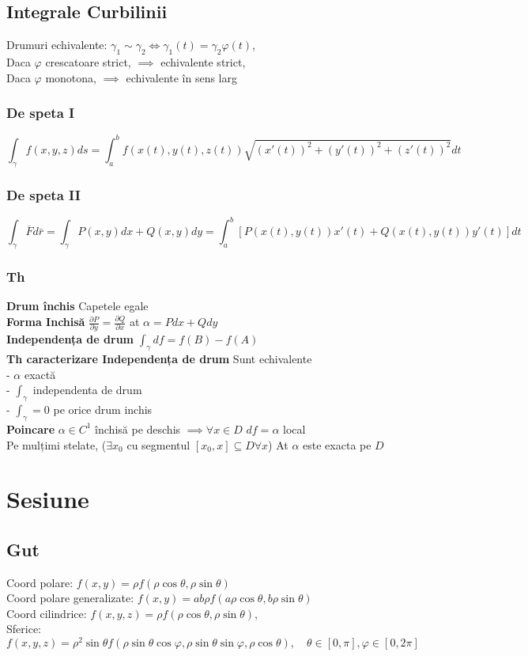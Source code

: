 \documentclass{article}
\newcommand{\parti}[2]{\frac{\partial #1}{ \partial #2}}
\renewcommand*{\phi}{\varphi}
\begin{document}
\subsection*{Integrale Curbilinii}
Drumuri echivalente: $\gamma_1 \sim \gamma_2 \iff \gamma_1(t) = \gamma_2{\phi(t)}$, \\
Daca $\phi$ crescatoare strict, $\implies$ echivalente strict,\\
Daca $\phi$ monotona, $\implies$ echivalente în sens larg
\subsubsection*{De speta I}
\[ \int_{\gamma} f(x, y, z)ds = \int_a^bf(x(t), y(t), z(t)) \sqrt{(x'(t))^2+(y'(t))^2+(z'(t))^2} dt \]

\subsubsection*{De speta II}
\[ \int_{\gamma}\overline{F}d\bar{r} = \int_{\gamma} P(x,y) dx+ Q(x,y)dy = \int_a^b \left[P(x(t), y(t))x'(t) + Q(x(t), y(t)) y'(t) \right]dt \]
\subsubsection*{Th}
\textbf{Drum închis} Capetele egale\\
\textbf{Forma Inchisă} $\parti{P}{y} = \parti{Q}{x}$ at $\alpha = Pdx+Qdy$\\
\textbf{Independența de drum} $\int_\gamma df = f(B) - f(A)$\\
\textbf{Th caracterizare Independența de drum} Sunt echivalente\\
\quad - $\alpha$ exactă\\
\quad - $\int_\gamma$ independenta de drum\\
\quad - $\int_\gamma = 0$ pe orice drum inchis \\
\textbf{Poincare} $\alpha \in C^1$ închisă pe deschis $\implies \forall x\in D$
$df = \alpha$ local
\\
Pe mulțimi stelate, ($\exists x_0$ cu segmentul $[x_0, x] \subseteq D \forall x$)
At $\alpha$ este exacta pe $D$



\newpage

\section{Sesiune}
\subsection*{Gut}
Coord polare: $f(x,y) = \rho f(\rho \cos \theta, \rho \sin\theta)$ \\
Coord polare generalizate: $f(x,y) = ab\rho f(a\rho\cos\theta, b\rho\sin\theta) $\\
Coord cilindrice: $f(x, y, z) = \rho f(\rho\cos\theta, \rho\sin\theta)$, \\
Sferice: $f(x, y,z) = \rho^2\sin\theta f(\rho \sin\theta\cos\varphi, \rho\sin\theta\sin\varphi, \rho\cos\theta),\quad \theta \in [0, \pi], \varphi \in[0, 2\pi]$
\end{document}

